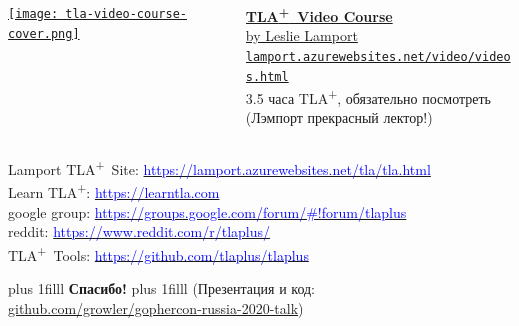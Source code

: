 \documentclass[
  11pt,aspectratio=1610,pdf,hyperref={unicode,colorlinks=false}
]{beamer}
\def\TLA{TLA\textsuperscript{+}}
\begin{document}
\begin{frame}[c]
  \begin{columns}
    \begin{column}{.45\textwidth}
      \centering
      \href{http://lamport.azurewebsites.net/video/videos.html}{%
        \texttt{[image: tla-video-course-cover.png]}
      }
    \end{column}
    \begin{column}{.45\textwidth}
      \href{http://lamport.azurewebsites.net/video/videos.html}{%
        {\Large\bf \TLA\ Video Course}\\
        {\normalsize by Leslie Lamport}\\
        {\tiny \nolinkurl{lamport.azurewebsites.net/video/videos.html}}
      }\\
      \vspace{3ex}
      \large
      3.5 часа \TLA, обязательно посмотреть\\
      \vspace{3ex}
      (Лэмпорт прекрасный лектор!)
    \end{column}
  \end{columns}
\end{frame}

\begin{frame}[c]
  \centering\large%
  \vfill%
  \begin{beamercolorbox}{}
    Lamport \TLA\ Site: \href{https://lamport.azurewebsites.net/tla/tla.html}{\textcolor{blue}{https://lamport.azurewebsites.net/tla/tla.html}}\\[2ex]
    Learn \TLA: \href{https://learntla.com/}{\textcolor{blue}{https://learntla.com}}\\[2ex]
    google group: \href{https://groups.google.com/forum/\#!forum/tlaplus}{\textcolor{blue}{https://groups.google.com/forum/\#!forum/tlaplus}}\\[2ex]
    reddit: \href{https://www.reddit.com/r/tlaplus/}{\textcolor{blue}{https://www.reddit.com/r/tlaplus/}}\\[2ex]
    \TLA\ Tools: \href{https://github.com/tlaplus/tlaplus}{\textcolor{blue}{https://github.com/tlaplus/tlaplus}}
  \end{beamercolorbox}
  \vfill%
\end{frame}

\newcommand{\btVFill}{\vskip0pt plus 1filll}
\begin{frame}
  \centering%
  \btVFill%
  {\Huge\bf Спасибо!}
  \btVFill%
  {\scriptsize\textcolor{black!70}{(Презентация и код: \href{https://github.com/growler/gophercon-russia-2020-talk}{github.com/growler/gophercon-russia-2020-talk})}\\}
\end{frame}
\end{document}
